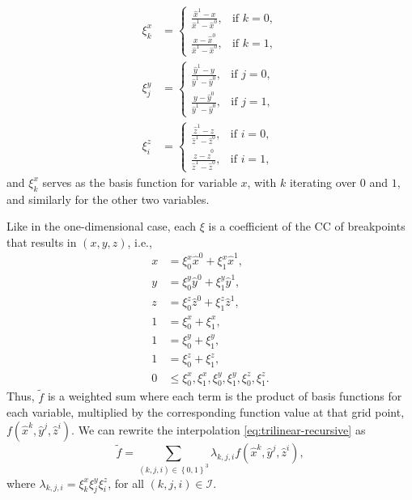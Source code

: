\documentclass[pdflatex,sn-mathphys-num]{sn-jnl}%
\newcommand{\new}[1]{#1}
\begin{document}
\begin{equation}
\begin{aligned}
\xi^x_{k} &= 
\begin{cases}
    \frac{\hat{x}^1 - x}{\hat{x}^1 - \hat{x}^0}, & \text{if } k = 0, \\
    \frac{x - \hat{x}^0}{\hat{x}^1 - \hat{x}^0}, & \text{if } k = 1,
\end{cases} \\
\xi^y_{j} &= 
\begin{cases}
    \frac{\hat{y}^1 - y}{\hat{y}^1 - \hat{y}^0}, & \text{if } j = 0, \\
    \frac{y - \hat{y}^0}{\hat{y}^1 - \hat{y}^0}, & \text{if } j = 1,
\end{cases}  \\
\xi^z_{i} &= 
\begin{cases}
    \frac{\hat{z}^1 - z}{\hat{z}^1 - \hat{z}^0}, & \text{if } i = 0, \\
    \frac{z - \hat{z}^0}{\hat{z}^1 - \hat{z}^0}, & \text{if } i = 1,
\end{cases}
\end{aligned}
\end{equation}
\new{and \(\xi^{x}_k\) serves as the basis function for variable $x$, with $k$ iterating over $0$ and $1$, and similarly for the other two variables}.

Like in the one-dimensional case, each $\xi$ is a coefficient of the CC of breakpoints that results in $\left( x,y,z \right) $, i.e.,
\begin{equation}
\begin{aligned}
    x &= \xi^x_{0}\hat{x}^0 + \xi^x_{1}\hat{x}^1 , \\
    y &= \xi^y_{0}\hat{y}^0 + \xi^y_{1}\hat{y}^1 , \\
    z &= \xi^z_{0}\hat{z}^0 + \xi^z_{1}\hat{z}^1 , \\
    1 &=  \xi^x_{0} +  \xi^x_{1} , \\
    1 &=  \xi^y_{0} +  \xi^y_{1} , \\
    1 &=  \xi^z_{0} +  \xi^z_{1} , \\
    0 &\leq \xi^x_{0}, \xi^x_{1}, \xi^y_{0}, \xi^y_{1}, \xi^z_{0}, \xi^z_{1}
.\end{aligned}
\end{equation}
Thus, \(\widetilde{f}\) is a weighted sum where each term is the product of basis functions for each variable, multiplied by the corresponding function value at that grid point, \(f(\hat{x}^k, \hat{y}^j, \hat{z}^i)\).
We can rewrite the interpolation \eqref{eq:trilinear-recursive} as
\begin{equation}
\widetilde{f} = \sum_{\left( k,j,i \right) \in \left\{ 0,1 \right\}^{3}} 
\lambda_{k,j,i}f(\hat{x}^k,\hat{y}^j,\hat{z}^i)
,
\end{equation}
where $\lambda_{k,j,i} = \xi^x_{k}\xi^y_{j}\xi^z_{i}$, for all $(k,j,i)\in\mathcal{I}$.
\end{document}
